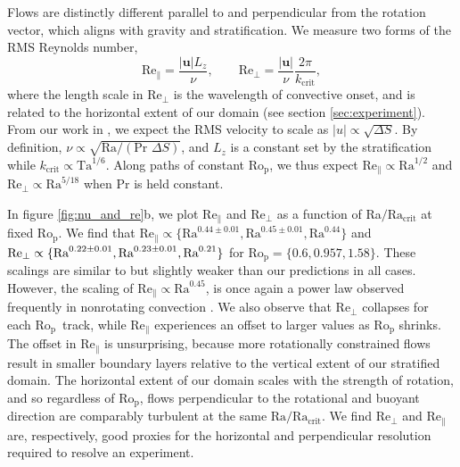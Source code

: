 \documentclass[twocolumn, amsmath, amsfonts, amssymb, trackchanges]{aastex62}
\newcommand{\pro}{\ensuremath{\text{Ro}_{\text{p}}}}
\begin{document}
Flows are distinctly different parallel to and perpendicular
from the rotation vector, which aligns with gravity and stratification.
We measure two forms of the RMS Reynolds number,
\begin{equation}
\text{Re}_{\parallel} = \frac{|\bm{u}| L_z}{\nu}, \qquad
\text{Re}_{\perp}     = \frac{|\bm{u}|}{\nu}\frac{2\pi}{k_{\text{crit}}},
\label{eqn:re_defn}
\end{equation}
where the length scale in $\text{Re}_{\perp}$ is the wavelength of convective onset, and is
related to the horizontal extent of our domain (see section \ref{sec:experiment}).
From our work in \AB, we expect the RMS velocity to scale as $|u| \propto \sqrt{\Delta S}$.
By definition, $\nu \propto \sqrt{\text{Ra}/(\text{Pr }\Delta S)}$, and $L_z$ is a constant
set by the stratification while $k_{\text{crit}} \propto \text{Ta}^{1/6}$. Along paths of
constant \pro, we thus expect $\text{Re}_{\parallel} \propto \text{Ra}^{1/2}$ and
$\text{Re}_{\perp} \propto \text{Ra}^{5/18}$ when $\text{Pr}$ is held constant.

In figure \ref{fig:nu_and_re}b, we plot $\text{Re}_{\parallel}$ and $\text{Re}_{\perp}$
as a function of Ra$/\text{Ra}_{\text{crit}}$ at fixed \pro. We find that $\text{Re}_\parallel \propto \{\text{Ra}^{0.44 \pm 0.01}, \text{Ra}^{0.45 \pm 0.01}, \text{Ra}^{0.44}\}$
and $\text{Re}_\perp \propto \{\text{Ra}^{0.22 \pm 0.01}, \\ \text{Ra}^{0.23 \pm 0.01}, \text{Ra}^{0.21}\}$ for
$\pro = \{0.6, 0.957, 1.58\}$. These scalings are similar to but slightly weaker than our
predictions in all cases. However, the scaling of $\text{Re}_{\parallel} \propto \text{Ra}^{0.45}$, 
is once again a power law observed frequently in nonrotating convection \citep[][\AB]{ahlers&all2009}.
We also observe that $\text{Re}_{\perp}$ collapses for each $\pro\,$ track,
while $\text{Re}_{\parallel}$ experiences an offset
to larger values as $\pro$ shrinks. The offset in $\text{Re}_{\parallel}$ is unsurprising, 
because more rotationally constrained flows result in smaller boundary layers relative to the 
vertical extent of our stratified domain. The horizontal extent of our domain scales with the
strength of rotation, and so regardless of \pro, flows perpendicular
to the rotational and buoyant direction are comparably turbulent at the same 
$\text{Ra}/\text{Ra}_\text{crit}$.
We find $\text{Re}_{\perp}$ and $\text{Re}_{\parallel}$ are, respectively, good proxies for
the horizontal and perpendicular resolution required to resolve an experiment.
\end{document}
